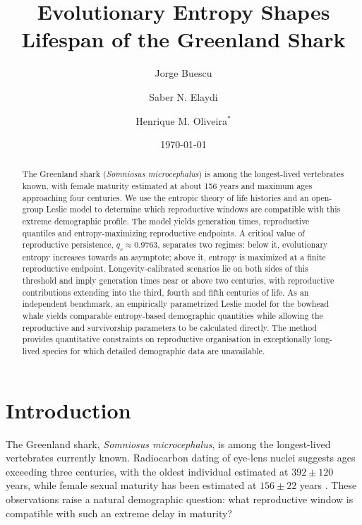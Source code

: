 \documentclass[11pt,a4paper]{amsart}
\title[Evolutionary Entropy and the Greenland Shark]
{Evolutionary Entropy Shapes Lifespan of the Greenland Shark}
\author[J. Buescu]{Jorge Buescu}
\author[S. Elaydi]{Saber N. Elaydi }
\author[H. M. Oliveira]{Henrique M. Oliveira$^*$}
\date{\today}
\begin{document}
\begin{abstract}
The Greenland shark (\emph{Somniosus microcephalus}) is among the
longest-lived vertebrates known, with female maturity estimated at
about 156 years and maximum ages approaching four centuries. We use
the entropic theory of life histories and an open-group Leslie model
to determine which reproductive windows are compatible with this
extreme demographic profile. The model yields generation times,
reproductive quantiles and entropy-maximizing reproductive endpoints.
A critical value of reproductive persistence, \(q_c\approx0.9763\),
separates two regimes: below it, evolutionary entropy increases
towards an asymptote; above it, entropy is maximized at a finite
reproductive endpoint. Longevity-calibrated scenarios lie on both
sides of this threshold and imply generation times near or above two
centuries, with reproductive contributions extending into the third,
fourth and fifth centuries of life. As an independent benchmark, an empirically parametrized Leslie model
for the bowhead whale yields comparable entropy-based demographic
quantities while allowing the reproductive and survivorship parameters
to be calculated directly. The method provides quantitative
constraints on reproductive organisation in exceptionally long-lived
species for which detailed demographic data are unavailable.
\end{abstract}

\maketitle

\section{Introduction}

The Greenland shark, \emph{Somniosus microcephalus}, is among the
longest-lived vertebrates currently known. 
Radiocarbon dating of
eye-lens nuclei suggests ages exceeding three centuries, with the
oldest individual estimated at $392 \pm 120$ years, while
female sexual maturity has been estimated at
$156 \pm 22$ years \cite{Nielsen2016GreenlandShark}.
%
These observations raise a natural demographic question: what reproductive window is compatible with such an extreme delay in maturity?
\end{document}
